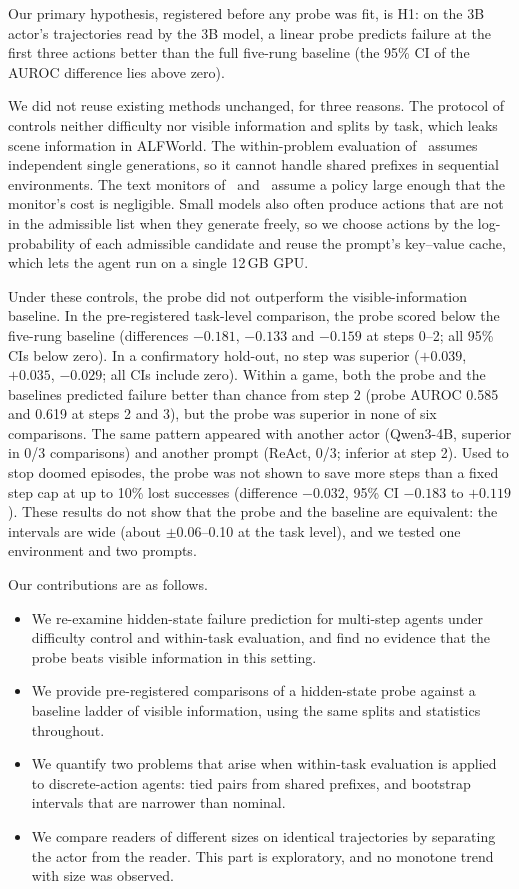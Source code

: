 \documentclass[11pt]{article}
\begin{document}
Our primary hypothesis, registered before any probe was fit, is H1: on the 3B actor's trajectories read by the 3B model, a linear probe predicts failure at the first three actions better than the full five-rung baseline (the 95\% CI of the AUROC difference lies above zero).

We did not reuse existing methods unchanged, for three reasons. The protocol of~\cite{ruan2026doomed} controls neither difficulty nor visible information and splits by task, which leaks scene information in ALFWorld.
The within-problem evaluation of~\cite{bulut2026problem} assumes independent single generations, so it cannot handle shared prefixes in sequential environments. The text monitors of~\cite{wang2026failfast} and~\cite{pham2026agentstop} assume a policy large enough that the monitor's cost is negligible.
Small models also often produce actions that are not in the admissible list when they generate freely, so we choose actions by the log-probability of each admissible candidate and reuse the prompt's key--value cache, which lets the agent run on a single 12\,GB GPU.

Under these controls, the probe did not outperform the visible-information baseline. In the pre-registered task-level comparison, the probe scored below the five-rung baseline (differences $-0.181$, $-0.133$ and $-0.159$ at steps 0--2; all 95\% CIs below zero).
In a confirmatory hold-out, no step was superior ($+0.039$, $+0.035$, $-0.029$; all CIs include zero). Within a game, both the probe and the baselines predicted failure better than chance from step 2 (probe AUROC 0.585 and 0.619 at steps 2 and 3),
but the probe was superior in none of six comparisons. The same pattern appeared with another actor (Qwen3-4B, superior in 0/3 comparisons) and another prompt (ReAct, 0/3; inferior at step 2).
Used to stop doomed episodes, the probe was not shown to save more steps than a fixed step cap at up to 10\% lost successes (difference $-0.032$, 95\% CI $-0.183$ to $+0.119$).
These results do not show that the probe and the baseline are equivalent: the intervals are wide (about $\pm$0.06--0.10 at the task level), and we tested one environment and two prompts.

Our contributions are as follows.
\begin{itemize}
\item We re-examine hidden-state failure prediction for multi-step agents under difficulty control and within-task evaluation, and find no evidence that the probe beats visible information in this setting.
\item We provide pre-registered comparisons of a hidden-state probe against a baseline ladder of visible information, using the same splits and statistics throughout.
\item We quantify two problems that arise when within-task evaluation is applied to discrete-action agents: tied pairs from shared prefixes, and bootstrap intervals that are narrower than nominal.
\item We compare readers of different sizes on identical trajectories by separating the actor from the reader. This part is exploratory, and no monotone trend with size was observed.
\end{itemize}
\end{document}
